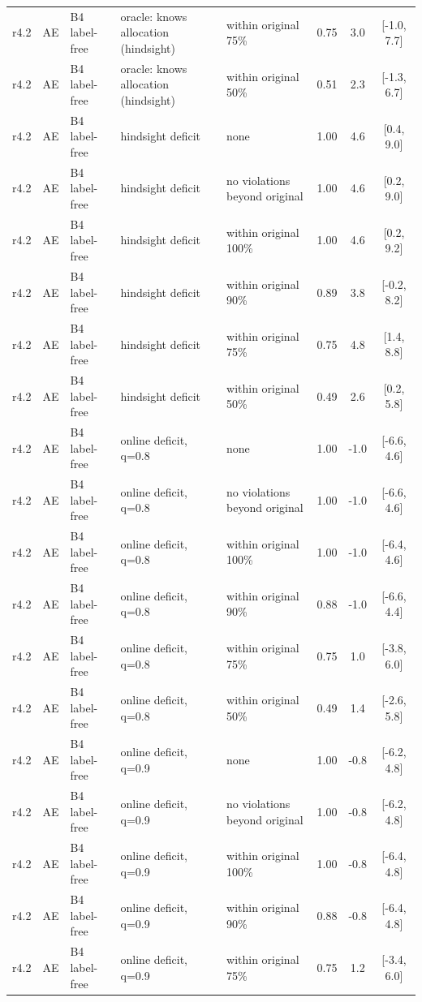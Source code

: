 \documentclass[10pt,onecolumn,letterpaper]{article}
\begin{document}
\begin{longtable}{lllp{4.2cm}p{3.4cm}ccc}
r4.2 & AE & B4 label-free & oracle: knows allocation (hindsight) & within original 75\% & 0.75 & 3.0 & [-1.0, 7.7] \\
r4.2 & AE & B4 label-free & oracle: knows allocation (hindsight) & within original 50\% & 0.51 & 2.3 & [-1.3, 6.7] \\
r4.2 & AE & B4 label-free & hindsight deficit & none & 1.00 & 4.6 & [0.4, 9.0] \\
r4.2 & AE & B4 label-free & hindsight deficit & no violations beyond original & 1.00 & 4.6 & [0.2, 9.0] \\
r4.2 & AE & B4 label-free & hindsight deficit & within original 100\% & 1.00 & 4.6 & [0.2, 9.2] \\
r4.2 & AE & B4 label-free & hindsight deficit & within original 90\% & 0.89 & 3.8 & [-0.2, 8.2] \\
r4.2 & AE & B4 label-free & hindsight deficit & within original 75\% & 0.75 & 4.8 & [1.4, 8.8] \\
r4.2 & AE & B4 label-free & hindsight deficit & within original 50\% & 0.49 & 2.6 & [0.2, 5.8] \\
r4.2 & AE & B4 label-free & online deficit, q=0.8 & none & 1.00 & -1.0 & [-6.6, 4.6] \\
r4.2 & AE & B4 label-free & online deficit, q=0.8 & no violations beyond original & 1.00 & -1.0 & [-6.6, 4.6] \\
r4.2 & AE & B4 label-free & online deficit, q=0.8 & within original 100\% & 1.00 & -1.0 & [-6.4, 4.6] \\
r4.2 & AE & B4 label-free & online deficit, q=0.8 & within original 90\% & 0.88 & -1.0 & [-6.6, 4.4] \\
r4.2 & AE & B4 label-free & online deficit, q=0.8 & within original 75\% & 0.75 & 1.0 & [-3.8, 6.0] \\
r4.2 & AE & B4 label-free & online deficit, q=0.8 & within original 50\% & 0.49 & 1.4 & [-2.6, 5.8] \\
r4.2 & AE & B4 label-free & online deficit, q=0.9 & none & 1.00 & -0.8 & [-6.2, 4.8] \\
r4.2 & AE & B4 label-free & online deficit, q=0.9 & no violations beyond original & 1.00 & -0.8 & [-6.2, 4.8] \\
r4.2 & AE & B4 label-free & online deficit, q=0.9 & within original 100\% & 1.00 & -0.8 & [-6.4, 4.8] \\
r4.2 & AE & B4 label-free & online deficit, q=0.9 & within original 90\% & 0.88 & -0.8 & [-6.4, 4.8] \\
r4.2 & AE & B4 label-free & online deficit, q=0.9 & within original 75\% & 0.75 & 1.2 & [-3.4, 6.0] \\

\end{longtable}
\end{document}
